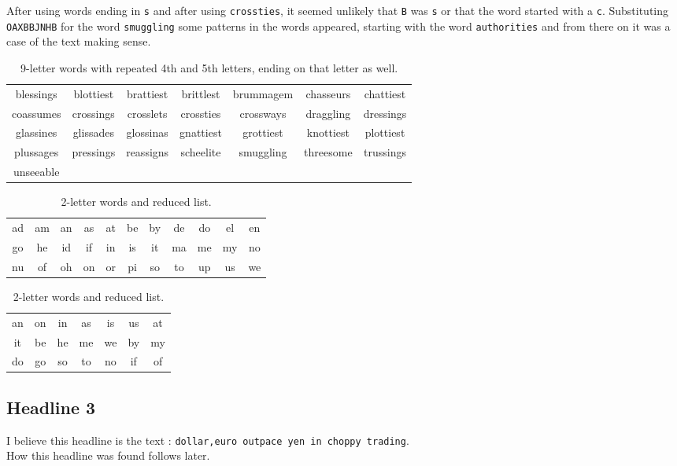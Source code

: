 \documentclass[12pt,a4paper,onecolumn]{article}
\begin{document}
After using words ending in \texttt{s} and after using \texttt{crossties}, it seemed unlikely that \texttt{B} was \texttt{s} or that the word started with a \texttt{c}. Substituting \texttt{OAXBBJNHB} for the word \texttt{smuggling} some patterns in the words appeared, starting with the word \texttt{authorities} and from there on it was a case of the text making sense.

\begin{table}
	\center
	\caption{9-letter words with repeated 4th and 5th letters, ending on that letter as well.}
	\label{words1}

	\begin{tabular}{c c c c c c c}
	\hline
	blessings & blottiest & brattiest & brittlest & brummagem & chasseurs &  	chattiest\\
	coassumes & crossings & crosslets & crossties & crossways & draggling &  	dressings\\
	glassines & glissades & glossinas & gnattiest & grottiest & knottiest & plottiest\\
	plussages & pressings & reassigns & scheelite & smuggling & threesome &  trussings\\
	unseeable  \\
	\end{tabular}
\end{table}

\begin{table}
\caption{2-letter words and reduced list.}
\label{words2}

	\begin{tabular}{|c c c c c c c c c c c|}
	\hline
	ad & am & an & as & at & be & by & de & do & el & en \\
	go & he & id & if & in & is & it & ma & me & my & no \\
	nu & of & oh & on & or & pi & so & to & up & us & we \\
	\hline
	\end{tabular}
	\quad
	\begin{tabular}{|c c c c c c c|}
	\hline
	an & on & in & as & is & us & at\\
	it & be & he & me & we & by & my\\
	do & go & so & to & no & if & of\\
	\hline
	\end{tabular}
\end{table}

\subsection{Headline 3}
I believe this headline is the text : \texttt{dollar,euro outpace yen in choppy trading}.\\
How this headline was found follows later.
\end{document}
